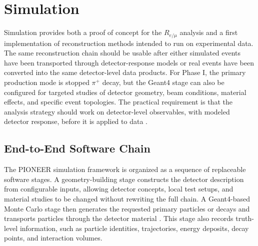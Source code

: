 \section{Simulation}
\label{sec:simulation}

Simulation provides both a proof of concept for the \(R_{e/\mu}\) analysis and
a first implementation of reconstruction methods intended to run on
experimental data. The same reconstruction chain should be usable after either
simulated events have been transported through detector-response models or real
events have been converted into the same detector-level data products. For
Phase I, the primary production mode is stopped \(\pi^+\) decay, but the
Geant4 stage can also be configured for targeted studies of detector geometry,
beam conditions, material effects, and specific event topologies. The practical
requirement is that the analysis strategy should work on detector-level
observables, with modeled detector response, before it is applied to data
\cite{schwendimann_framework_status_2025,carlton_annual_update_2026}.

\subsection{End-to-End Software Chain}
\label{subsec:simulation-software-chain}

The PIONEER simulation framework is organized as a sequence of replaceable
software stages. A geometry-building stage constructs the detector description
from configurable inputs, allowing detector concepts, local test setups, and
material studies to be changed without rewriting the full chain. A
Geant4-based Monte Carlo stage then generates the requested primary particles
or decays and transports particles through the detector material
\cite{geant4_2003,geant4_2016}. This stage also records truth-level
information, such as particle identities, trajectories, energy deposits, decay
points, and interaction volumes.

